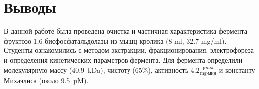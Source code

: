\section{Выводы}
В данной работе была проведена очистка и частичная характеристика фермента
фруктозо-1,6-бисфосфатальдолазы из мышц кролика (8 ml, 32.7 mg/ml).
Студенты ознакомились с методом экстракции,
фракционирования, электрофореза и
определения кинетических параметров фермента.
Для фермента определили
молекулярную массу (40.9~kDa),
чистоту (65\%),
активность $4.2 \frac{µmol}{\text{mg} \cdot \text{мин}}$ и
константу Михаэлиса (около 9.5~µM).

